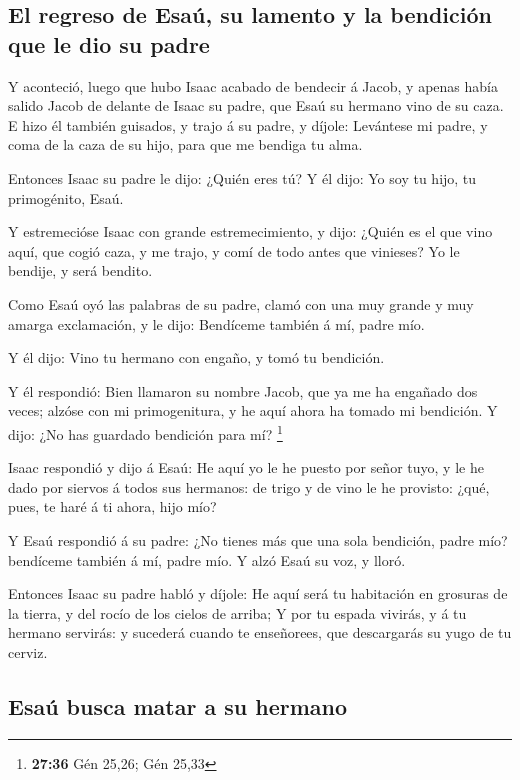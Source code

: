 \hypertarget{el-regreso-de-esauxfa-su-lamento-y-la-bendiciuxf3n-que-le-dio-su-padre}{%
\subsection{El regreso de Esaú, su lamento y la bendición que le dio su
padre}\label{el-regreso-de-esauxfa-su-lamento-y-la-bendiciuxf3n-que-le-dio-su-padre}}

 Y aconteció, luego que hubo Isaac acabado de bendecir á
Jacob, y apenas había salido Jacob de delante de Isaac su padre, que
Esaú su hermano vino de su caza.  E hizo él también
guisados, y trajo á su padre, y díjole: Levántese mi padre, y coma de la
caza de su hijo, para que me bendiga tu alma.

 Entonces Isaac su padre le dijo: ¿Quién eres tú? Y él
dijo: Yo soy tu hijo, tu primogénito, Esaú.

 Y estremecióse Isaac con grande estremecimiento, y dijo:
¿Quién es el que vino aquí, que cogió caza, y me trajo, y comí de todo
antes que vinieses? Yo le bendije, y será bendito.

 Como Esaú oyó las palabras de su padre, clamó con una muy
grande y muy amarga exclamación, y le dijo: Bendíceme también á mí,
padre mío.

 Y él dijo: Vino tu hermano con engaño, y tomó tu
bendición.

 Y él respondió: Bien llamaron su nombre Jacob, que ya me
ha engañado dos veces; alzóse con mi primogenitura, y he aquí ahora ha
tomado mi bendición. Y dijo: ¿No has guardado bendición para mí?
\footnote{\textbf{27:36} Gén 25,26; Gén 25,33}

 Isaac respondió y dijo á Esaú: He aquí yo le he puesto por
señor tuyo, y le he dado por siervos á todos sus hermanos: de trigo y de
vino le he provisto: ¿qué, pues, te haré á ti ahora, hijo mío?

 Y Esaú respondió á su padre: ¿No tienes más que una sola
bendición, padre mío? bendíceme también á mí, padre mío. Y alzó Esaú su
voz, y lloró.

 Entonces Isaac su padre habló y díjole: He aquí será tu
habitación en grosuras de la tierra, y del rocío de los cielos de
arriba;  Y por tu espada vivirás, y á tu hermano servirás:
y sucederá cuando te enseñorees, que descargarás su yugo de tu cerviz.

\hypertarget{esauxfa-busca-matar-a-su-hermano}{%
\subsection{Esaú busca matar a su
hermano}\label{esauxfa-busca-matar-a-su-hermano}}

